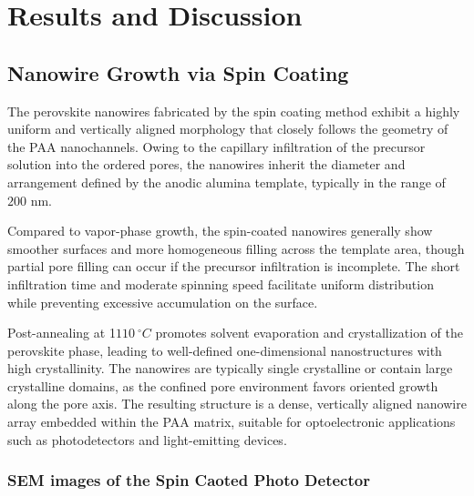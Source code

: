 \documentclass{rapportCS}
\begin{document}
	\section{Results and Discussion}
	
	\subsection{Nanowire Growth via Spin Coating}
	
	The perovskite nanowires fabricated by the spin coating method exhibit a highly uniform and vertically aligned morphology that closely follows the geometry of the PAA nanochannels. Owing to the capillary infiltration of the  precursor solution into the ordered pores, the nanowires inherit the diameter and arrangement defined by the anodic alumina template, typically in the range of $200$ nm.
	
	Compared to vapor-phase growth, the spin-coated nanowires generally show smoother surfaces and more homogeneous filling across the template area, though partial pore filling can occur if the precursor infiltration is incomplete. The short infiltration time and moderate spinning speed facilitate uniform distribution while preventing excessive accumulation on the surface.
	
	Post-annealing at 1$110~^{\circ}C$ promotes solvent evaporation and crystallization of the perovskite phase, leading to well-defined one-dimensional nanostructures with high crystallinity. The nanowires are typically single crystalline or contain large crystalline domains, as the confined pore environment favors oriented growth along the pore axis. The resulting structure is a dense, vertically aligned nanowire array embedded within the PAA matrix, suitable for optoelectronic applications such as photodetectors and light-emitting devices.
	
	\subsubsection{SEM images of the Spin Caoted Photo Detector}
	
\end{document}
